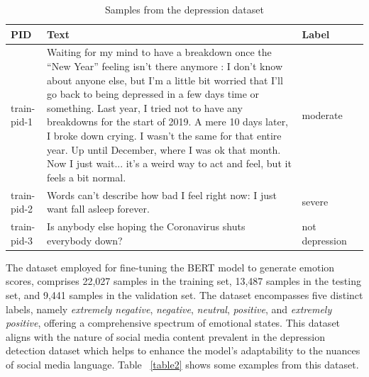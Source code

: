 \documentclass{article}
\begin{document}
\begin{table}[h]
  \caption{Samples from the depression dataset}
  \label{table1}
  \centering
  \renewcommand{\arraystretch}{1.5} %
  \begin{tabular}{lp{8cm}p{3cm}p{3cm}}
    \toprule
    \textbf{PID} & \textbf{Text} & \textbf{Label} \\
    \midrule
    train-pid-1 & Waiting for my mind to have a breakdown once the “New Year” feeling isn’t there anymore : I don’t know about anyone else, but I’m a little bit worried that I’ll go back to being depressed in a few days time or something. Last year, I tried not to have any breakdowns for the start of 2019. A mere 10 days later, I broke down crying. I wasn’t the same for that entire year. Up until December, where I was ok that month. Now I just wait... it’s a weird way to act and feel, but it feels a bit normal.  & moderate     \\ \hline

    train-pid-2 & Words can't describe how bad I feel right now: I just want fall asleep forever. & severe \\ \hline

    train-pid-3 & Is anybody else hoping the Coronavirus shuts everybody down? & not depression  \\
    \bottomrule
  \end{tabular}
\end{table}

The dataset \citep{Berenstein} employed for fine-tuning the BERT model to generate emotion scores, comprises 22,027 samples in the training set, 13,487 samples in the testing set, and 9,441 samples in the validation set. The dataset encompasses five distinct labels, namely \emph{extremely negative}, \emph{negative}, \emph{neutral}, \emph{positive}, and \emph{extremely positive}, offering a comprehensive spectrum of emotional states. This dataset aligns with the nature of social media content prevalent in the depression detection dataset which helps to enhance the model's adaptability to the nuances of social media language. Table ~\ref{table2} shows some examples from this dataset.
\end{document}
